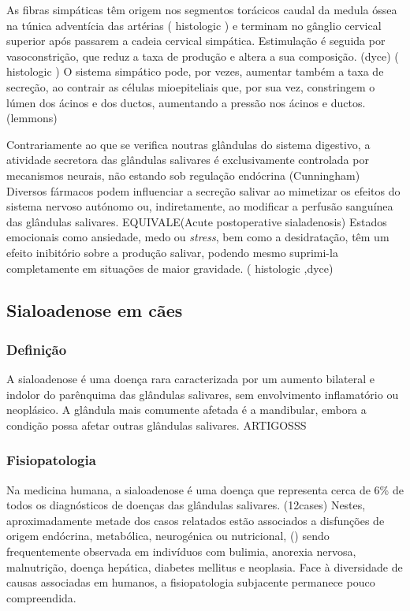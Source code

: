 As fibras simpáticas têm origem nos segmentos torácicos caudal da medula óssea na túnica adventícia das artérias (\cite{Poirier2018} histologic \cite{animals}) e terminam no gânglio cervical superior após passarem a cadeia cervical simpática. Estimulação é seguida por vasoconstrição, que reduz a taxa de produção e altera a sua composição. (dyce) (\cite{Poirier2018} histologic \cite{animals}) O sistema simpático pode, por vezes, aumentar também a taxa de secreção, ao contrair as células mioepiteliais que, por sua vez, constringem o lúmen dos ácinos e dos ductos, aumentando a pressão nos ácinos e ductos. (lemmons)


Contrariamente ao que se verifica noutras glândulas do sistema digestivo, a atividade secretora das glândulas salivares é exclusivamente controlada por mecanismos neurais, não estando sob regulação endócrina (Cunningham) Diversos fármacos podem influenciar a secreção salivar ao mimetizar os efeitos do sistema nervoso autónomo ou, indiretamente, ao modificar a perfusão sanguínea das glândulas salivares. \cite{Cattai2016} EQUIVALE(Acute postoperative sialadenosis) Estados emocionais como ansiedade, medo ou \textit{stress}, bem como a desidratação, têm um efeito inibitório sobre a produção salivar, podendo mesmo suprimi-la completamente em situações de maior gravidade. (\cite{Poirier2018} histologic \cite{animals},dyce) 


\subsection{Sialoadenose em cães}

\subsubsection{Definição}

A sialoadenose é uma doença rara caracterizada por um aumento bilateral e indolor do parênquima das glândulas salivares, sem envolvimento inflamatório ou neoplásico. A glândula mais comumente afetada é a mandibular, embora a condição possa afetar outras glândulas salivares. ARTIGOSSS

\subsubsection{Fisiopatologia}

Na medicina humana, a sialoadenose é uma doença que representa cerca de 6\% de todos os diagnósticos de doenças das glândulas salivares. (12cases) Nestes, aproximadamente metade dos casos relatados estão associados a disfunções de origem endócrina, metabólica, neurogénica ou nutricional, (\cite{Trinka2023}) sendo frequentemente observada em indivíduos com bulimia, anorexia nervosa, malnutrição, doença hepática, diabetes mellitus e neoplasia. \cite{Alcoverro2014} Face à diversidade de causas associadas em humanos, a fisiopatologia subjacente permanece pouco compreendida. \cite{Ide2011}


